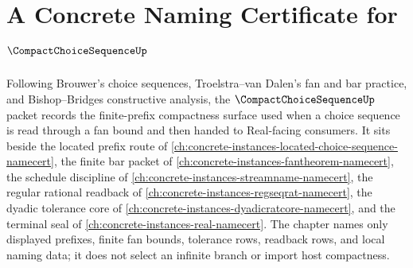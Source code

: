 \chapter{A Concrete Naming Certificate for $\CompactChoiceSequenceUp$}
\label{ch:concrete-instances-compact-choice-sequence-namecert}

Following Brouwer's choice sequences, Troelstra--van Dalen's fan and bar practice, and Bishop--Bridges constructive analysis, the $\CompactChoiceSequenceUp$ packet records the finite-prefix compactness surface used when a choice sequence is read through a fan bound and then handed to Real-facing consumers. It sits beside the located prefix route of \autoref{ch:concrete-instances-located-choice-sequence-namecert}, the finite bar packet of \autoref{ch:concrete-instances-fantheorem-namecert}, the schedule discipline of \autoref{ch:concrete-instances-streamname-namecert}, the regular rational readback of \autoref{ch:concrete-instances-regseqrat-namecert}, the dyadic tolerance core of \autoref{ch:concrete-instances-dyadicratcore-namecert}, and the terminal seal of \autoref{ch:concrete-instances-real-namecert}. The chapter names only displayed prefixes, finite fan bounds, tolerance rows, readback rows, and local naming data; it does not select an infinite branch or import host compactness.

